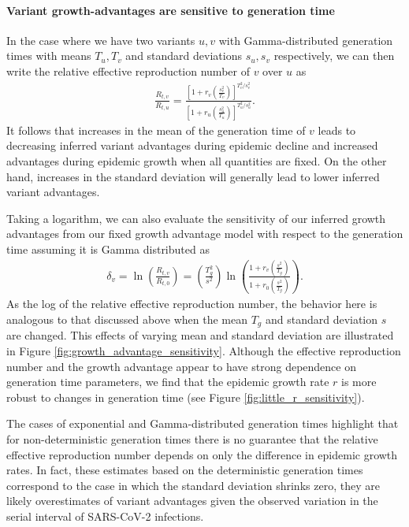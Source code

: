 \documentclass[11pt,oneside,letterpaper]{article}
\begin{document}
\paragraph{Variant growth-advantages are sensitive to generation time}%

In the case where we have two variants $u, v$ with Gamma-distributed generation times with means $T_{u}, T_{v}$ and standard deviations $s_{u}, s_{v}$ respectively, we can then write the relative effective reproduction number of $v$ over $u$ as
\begin{align*}
\frac{R_{t,v}}{R_{t,u}} = \frac{\left[1 + r_{v}  \left(\frac{s_{v}^{2}}{T_{v}}\right)\right]^{T_{v}^{2} / s_{v}^{2}}}{\left[1 + r_{u} \left(\frac{s_{u}^{2}}{T_{u}}\right)\right]^{T_{u}^{2} / s_{u}^{2}}}.
\end{align*}
It follows that increases in the mean of the generation time of $v$ leads to decreasing inferred variant advantages during epidemic decline and increased advantages during epidemic growth when all quantities are fixed.
On the other hand, increases in the standard deviation will generally lead to lower inferred variant advantages.

Taking a logarithm, we can also evaluate the sensitivity of our inferred growth advantages from our fixed growth advantage model with respect to the generation time assuming it is Gamma distributed as
\begin{align*}
 \delta_{v}  = \ln \left( \frac{R_{t,v}}{R_{t,0}} \right) = \left( \frac{T_{g}^{2}}{s^{2}} \right)  \ln \left( \frac{1 + r_{v}  \left(\frac{s^{2}}{T_{g}}\right)}{1 + r_{0} \left(\frac{s^{2}}{T_{g}}\right) } \right).
\end{align*}
As the log of the relative effective reproduction number, the behavior here is analogous to that discussed above when the mean $T_{g}$ and standard deviation $s$ are changed.
This effects of varying mean and standard deviation are illustrated in Figure \ref{fig:growth_advantage_sensitivity}.
Although the effective reproduction number and the growth advantage appear to have strong dependence on generation time parameters, we find that the epidemic growth rate $r$ is more robust to changes in generation time (see Figure \ref{fig:little_r_sensitivity}).

The cases of exponential and Gamma-distributed generation times highlight that for non-deterministic generation times there is no guarantee that the relative effective reproduction number depends on only the difference in epidemic growth rates.
In fact, these estimates based on the deterministic generation times correspond to the case in which the standard deviation shrinks zero, they are likely overestimates of variant advantages given the observed variation in the serial interval of SARS-CoV-2 infections.
\end{document}
